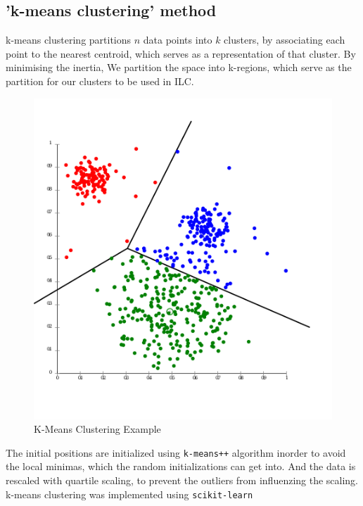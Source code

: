 \subsection{'k-means clustering' method}
k-means clustering partitions $n$ data points into $k$ clusters, by associating each point to the
nearest centroid, which serves as a representation of that cluster. By minimising the inertia,
We partition the space into k-regions, which serve as the partition for our clusters to be used in
ILC.
\begin{figure}
  \begin{center}
  \includegraphics[width = 0.5\linewidth]{kmeans_example.png}
  \end{center}
  \caption{K-Means Clustering Example}
\end{figure}

The initial positions are initialized using \texttt{k-means++} algorithm inorder to avoid the
local minimas, which the random initializations can get into. And the data is rescaled with
quartile scaling, to prevent the outliers from influenzing the scaling.
k-means clustering was implemented
using \texttt{scikit-learn} \cite{scikit-learn}

